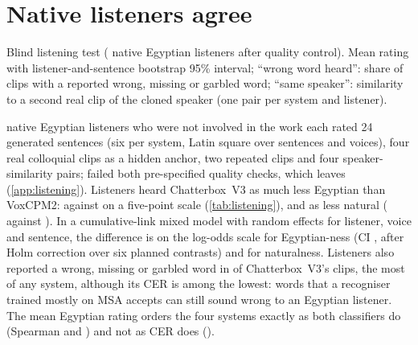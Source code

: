\documentclass[11pt]{article}
\newcommand{\vox}{VoxCPM2\xspace}
\newcommand{\cbthree}{Chatterbox~V3\xspace}
\begin{document}
\section{Native listeners agree}\label{sec:listeners}

\begin{table}[t]
\centering\small
\begin{adjustbox}{max width=\linewidth}
\end{adjustbox}
\caption{Blind listening test ( native Egyptian listeners after quality control). Mean rating with
listener-and-sentence bootstrap 95\% interval; ``wrong word heard'': share of clips with a reported wrong, missing or
garbled word; ``same speaker'': similarity to a second real clip of the cloned speaker (one pair per system and listener).}
\label{tab:listening}
\end{table}

 native Egyptian listeners who were not involved in the work each rated 24 generated sentences (six per
system, Latin square over sentences and voices), four real colloquial clips as a hidden anchor, two repeated clips and
four speaker-similarity pairs;  failed both pre-specified quality checks, which leaves 
(\cref{app:listening}). Listeners heard \cbthree as much less Egyptian than \vox:  against
 on a five-point scale (\cref{tab:listening}), and as less natural ( against
). In a cumulative-link mixed model with random effects for listener, voice and sentence, the
difference is  on the log-odds scale for Egyptian-ness (CI ,
 after Holm correction over six planned contrasts) and  for
naturalness. Listeners also reported a wrong, missing or garbled word in  of \cbthree's clips, the most of
any system, although its CER is among the lowest: words that a recogniser trained mostly on MSA accepts can still sound
wrong to an Egyptian listener. The mean Egyptian rating orders the four systems exactly as both classifiers do (Spearman
 and ) and not as CER does ().
\end{document}
